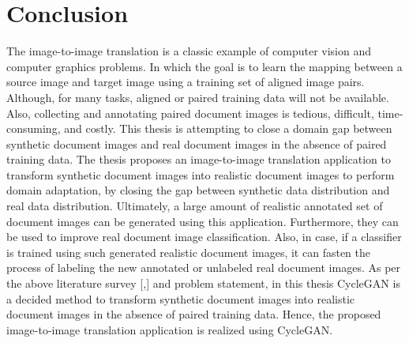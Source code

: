 \section{Conclusion}\label{rwconclusion}

The image-to-image translation is a classic example of computer vision and computer graphics problems. In which the goal is to learn the mapping between a source image and target image using a training set of aligned image pairs. Although, for many tasks, aligned or paired training data will not be available. Also, collecting and annotating paired document images is tedious, difficult, time-consuming, and costly. This thesis is attempting to close a domain gap between synthetic document images and real document images in the absence of paired training data. The thesis proposes an image-to-image translation application to transform synthetic document images into realistic document images to perform domain adaptation, by closing the gap between synthetic data distribution and real data distribution. Ultimately, a large amount of realistic annotated set of document images can be generated using this application. Furthermore, they can be used to improve real document image classification. Also, in case, if a classifier is trained using such generated realistic document images, it can fasten the process of labeling the new annotated or unlabeled real document images. As per the above literature survey [\cite{zhu2020unpaired},\cite{sharma2019learning}] and problem statement, in this thesis \ac{CycleGAN} is a decided method to transform synthetic document images into realistic document images in the absence of paired training data. Hence, the proposed image-to-image translation application is realized using \ac{CycleGAN}.












